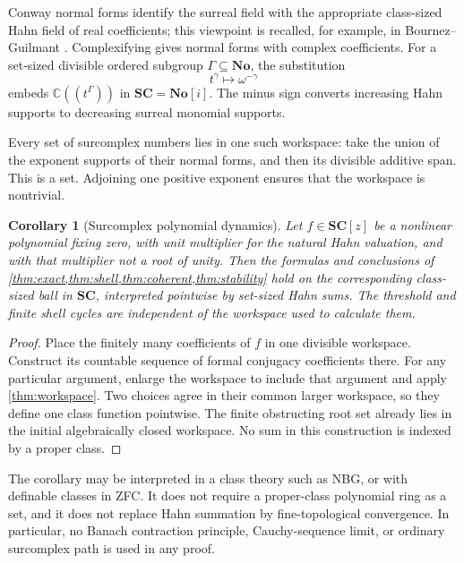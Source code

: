 \documentclass[11pt,letterpaper]{article}
\numberwithin{equation}{section}
\theoremstyle{plain}
\newtheorem{corollary}[theorem]{Corollary}
\theoremstyle{definition}
\theoremstyle{remark}
\newcommand{\C}{\mathbb C}
\newcommand{\No}{\mathbf{No}}
\newcommand{\SC}{\mathbf{SC}}
\begin{document}
Conway normal forms identify the surreal field with the appropriate
class-sized Hahn field of real coefficients; this viewpoint is recalled,
for example, in Bournez--Guilmant \cite{bournez-guilmant}.
Complexifying gives normal forms with complex coefficients. For a
set-sized divisible ordered subgroup $\Gamma\subseteq\No$, the substitution
\begin{equation}\label{eq:surreal-embedding}
 t^\gamma\longmapsto\omega^{-\gamma}
\end{equation}
embeds $\C((t^\Gamma))$ in $\SC=\No[i]$. The minus sign converts
increasing Hahn supports to decreasing surreal monomial supports.

Every set of surcomplex numbers lies in one such workspace: take the union
of the exponent supports of their normal forms, and then its divisible
additive span. This is a set. Adjoining one positive exponent ensures that
the workspace is nontrivial.

\begin{corollary}[Surcomplex polynomial dynamics]\label{cor:surcomplex}
Let $f\in\SC[z]$ be a nonlinear polynomial fixing zero, with unit
multiplier for the natural Hahn valuation, and with that multiplier not a
root of unity. Then the formulas and conclusions of
\cref{thm:exact,thm:shell,thm:coherent,thm:stability} hold on the corresponding
class-sized ball in $\SC$, interpreted pointwise by set-sized Hahn sums.
The threshold and finite shell cycles are independent of the workspace used
to calculate them.
\end{corollary}

\begin{proof}
Place the finitely many coefficients of $f$ in one divisible workspace.
Construct its countable sequence of formal conjugacy coefficients there.
For any particular argument, enlarge the workspace to include that argument
and apply \cref{thm:workspace}. Two choices agree in their common larger
workspace, so they define one class function pointwise. The finite
obstructing root set already lies in the initial algebraically closed
workspace. No sum in this construction is indexed by a proper class.
\end{proof}

The corollary may be interpreted in a class theory such as NBG, or with
definable classes in ZFC. It does not require a proper-class polynomial ring
as a set, and it does not replace Hahn summation by fine-topological
convergence. In particular, no Banach contraction principle, Cauchy-sequence
limit, or ordinary surcomplex path is used in any proof.
\end{document}
